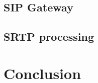 \section{SIP Gateway}

\section{SRTP processing}












\chapter{Conclusion}\label{chapter:conclusion}


